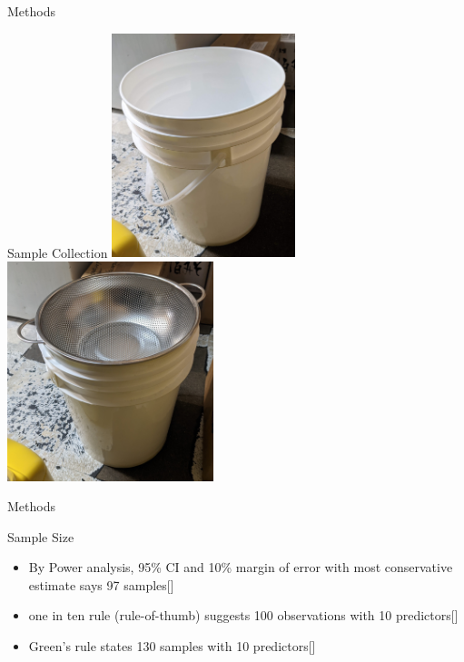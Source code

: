 \documentclass[
  ignorenonframetext,
]{beamer}
\providecommand{\tightlist}{%
  \setlength{\itemsep}{0pt}\setlength{\parskip}{0pt}}
\begin{document}
\begin{frame}{Methods}
\protect\hypertarget{methods-2}{}
\begin{block}{Sample Collection}
\protect\hypertarget{sample-collection}{}
\includegraphics[width=0.4\textwidth,height=\textheight]{busket.jpg}
\includegraphics[width=0.45\textwidth,height=\textheight]{busketStrainer.jpg}
\end{block}
\end{frame}

\begin{frame}{Methods}
\protect\hypertarget{methods-3}{}
\begin{block}{Sample Size}
\protect\hypertarget{sample-size}{}
\begin{itemize}
\tightlist
\item
  By Power analysis, 95\% CI and 10\% margin of error with most
  conservative estimate says 97 samples{[}{]}
\item
  one in ten rule (rule-of-thumb) suggests 100 observations with 10
  predictors{[}{]}
\item
  Green's rule states 130 samples with 10 predictors{[}{]}
\end{itemize}
\end{block}
\end{frame}
\end{document}
